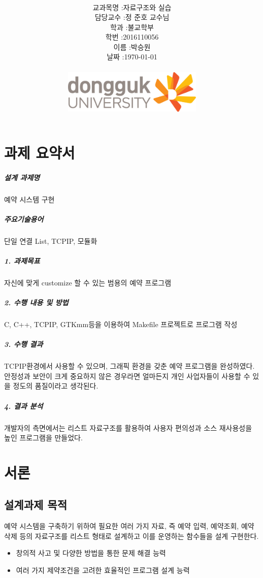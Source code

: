 \documentclass[12pt,a4paper]{report}
\title{
	\centering
	\pgfornament[width=12cm,color=teal]{84}\\
	\vspace{1cm}
	\fontsize{50}{50} \selectfont {설계과제 최종 보고서\\예약 시스템 구현}\\
		\pgfornament[width=12cm,color=teal]{88}\\
	\vfill}
\author{
	\LARGE
	\begin{tabular}{rl}
		\hline
		교과목명 : & 자료구조와 실습\\
		담당교수 : & 정 준호 교수님\\
		학과 : & 불교학부 \\
		학번 : & 2016110056\\ 
		이름 : & 박승원\\
		날짜 : & \today\\
		\hline
	\end{tabular}\vspace{2cm}
	\\
\includegraphics[width=0.5\textwidth]{logo.jpg}
	}
\date{}
\begin{document}
\maketitle


\newpage
\tableofcontents
\newpage
\chapter*{과제 요약서}
\paragraph{설계 과제명} 예약 시스템 구현\\ 
\paragraph{주요기술용어} 단일 연결 List, TCPIP, 모듈화\\
\paragraph{1. 과제목표} 자신에 맞게 customize 할 수 있는 범용의 예약 프로그램\\
\paragraph{2. 수행 내용 및 방법} C, C++, TCPIP, GTKmm등을 이용하여 Makefile 프로젝트로  프로그램 작성\\
\paragraph{	3. 수행 결과} TCPIP환경에서 사용할 수 있으며, 그래픽 환경을 갖춘 예약 프로그램을 완성하였다. 안정성과 보안이 크게 중요하지 않은 경우라면 얼마든지 개인 사업자들이 사용할 수 있을 정도의 품질이라고 생각된다.\\
\paragraph{	4. 결과 분석} 개발자의 측면에서는 리스트 자료구조를 활용하여 사용자 편의성과 소스 재사용성을 높인 프로그램을 만들었다.\\

\noindent
\chapter{서론}
\section{설계과제 목적}
예약 시스템을 구축하기 위하여 필요한 여러 가지 자료, 즉 예약 입력, 예약조회, 예약삭제 등의 자료구조를 리스트 형태로 설계하고 이를 운영하는 함수들을 설계 구현한다.
\begin{itemize}
\item 창의적 사고 및 다양한 방법을 통한 문제 해결 능력
\item 여러 가지 제약조건을 고려한 효율적인 프로그램 설계 능력
\end{itemize}
\end{document}
